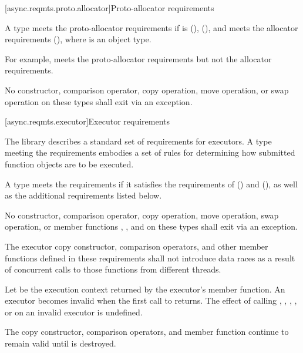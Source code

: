 [async.reqmts.proto.allocator]{Proto-allocator requirements}

\pnum
A type  meets the proto-allocator requirements if  is  (),  (), and  meets the allocator requirements (), where  is an object type. \begin{note} For example,  meets the proto-allocator requirements but not the allocator requirements. \end{note} No constructor, comparison operator, copy operation, move operation, or swap operation on these types shall exit via an exception.



[async.reqmts.executor]{Executor requirements}

\pnum
The library describes a standard set of requirements for executors. A type meeting the  requirements embodies a set of rules for determining how submitted function objects are to be executed.

\pnum
A type  meets the  requirements if it satisfies the requirements of  () and  (), as well as the additional requirements listed below.

\pnum
No constructor, comparison operator, copy operation, move operation, swap operation, or member functions , , and  on these types shall exit via an exception.

\pnum
 The executor copy constructor, comparison operators, and other member functions defined in these requirements shall not introduce data races as a result of concurrent calls to those functions from different threads.

\pnum
Let  be the execution context returned by the executor's  member function. An executor becomes invalid when the first call to  returns. The effect of calling , , , , or  on an invalid executor is undefined. \begin{note} The copy constructor, comparison operators, and  member function continue to remain valid until  is destroyed. \end{note}

